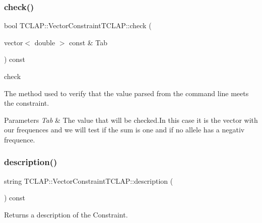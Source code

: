 \subsubsection{\texorpdfstring{check()}{check()}}
{\footnotesize\ttfamily bool T\+C\+L\+A\+P\+::\+Vector\+Constraint\+T\+C\+L\+A\+P\+::check (\begin{DoxyParamCaption}\item[{vector$<$ double $>$ const \&}]{Tab }\end{DoxyParamCaption}) const}



check 

The method used to verify that the value parsed from the command line meets the constraint. 
\begin{DoxyParams}{Parameters}
{\em Tab} & The value that will be checked.\+In this case it is the vector with our frequences and we will test if the sum is one and if no allele has a negativ frequence. \\
\hline
\end{DoxyParams}
\hypertarget{class_t_c_l_a_p_1_1_vector_constraint_t_c_l_a_p_afd3adf7e8e0ab6fac8ca3468fbb85b3d}{}\label{class_t_c_l_a_p_1_1_vector_constraint_t_c_l_a_p_afd3adf7e8e0ab6fac8ca3468fbb85b3d} 
\subsubsection{\texorpdfstring{description()}{description()}}
{\footnotesize\ttfamily string T\+C\+L\+A\+P\+::\+Vector\+Constraint\+T\+C\+L\+A\+P\+::description (\begin{DoxyParamCaption}{ }\end{DoxyParamCaption}) const}



Returns a description of the Constraint. 

\hypertarget{class_t_c_l_a_p_1_1_vector_constraint_t_c_l_a_p_a7f0263b2cbcff5fda6452dfe7f4dd028}{}\label{class_t_c_l_a_p_1_1_vector_constraint_t_c_l_a_p_a7f0263b2cbcff5fda6452dfe7f4dd028} 
